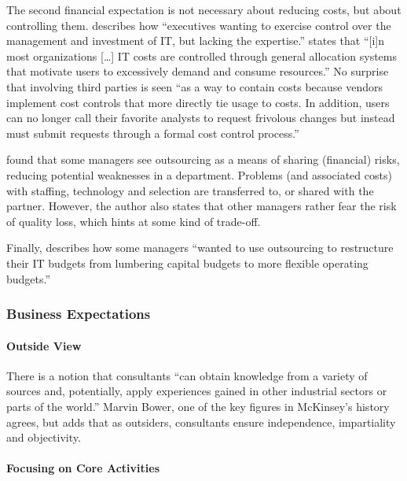 \documentclass[12pt]{article}
\begin{document}
The second financial expectation is not necessary about reducing costs,
but about controlling them. \citet[233]{sturdy1998} describes how
``executives wanting to exercise control over the management and
investment of IT, but lacking the expertise.'' \citet[10]{lacity1994}
states that ``{[}i{]}n most organizations {[}\ldots{]} IT costs are
controlled through general allocation systems that motivate users to
excessively demand and consume resources.'' No surprise that involving
third parties is seen ``as a way to contain costs because vendors
implement cost controls that more directly tie usage to costs. In
addition, users can no longer call their favorite analysts to request
frivolous changes but instead must submit requests through a formal cost
control process.''

\citet[454]{ketler1993} found that some managers see outsourcing as a
means of sharing (financial) risks, reducing potential weaknesses in a
department. Problems (and associated costs) with staffing, technology
and selection are transferred to, or shared with the partner. However,
the author also states that other managers rather fear the risk of
quality loss, which hints at some kind of trade-off.

Finally, \citet{lacity1994} describes how some managers ``wanted to use
outsourcing to restructure their IT budgets from lumbering capital
budgets to more flexible operating budgets.''

\subsubsection{Business Expectations}\label{business-expectations}

\paragraph{Outside View}\label{outside-view}

There is a notion that consultants ``can obtain knowledge from a variety
of sources and, potentially, apply experiences gained in other
industrial sectors or parts of the world.'' \citep[ 3]{armbruster2006}
Marvin Bower, one of the key figures in McKinsey's history agrees, but
adds that as outsiders, consultants ensure independence, impartiality
and objectivity. \citep[ 123]{bower1979}

\paragraph{Focusing on Core
Activities}\label{focusing-on-core-activities}
\end{document}
